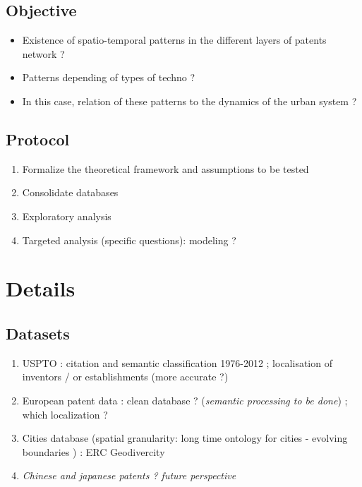 \subsection{Objective}

\begin{itemize}
	\item Existence of spatio-temporal patterns in the different layers of patents network ?
	\item Patterns depending of types of techno ?
	\item In this case, relation of these patterns to the dynamics of the urban system ?
\end{itemize}



\subsection{Protocol}


\begin{enumerate}
	\item Formalize the theoretical framework and assumptions to be tested
	\item Consolidate databases
	\item Exploratory analysis
	\item Targeted analysis (specific questions): modeling ?
\end{enumerate}



\section{Details}


\subsection{Datasets}

\begin{enumerate}
	\item USPTO : citation and semantic classification 1976-2012 \cite{bergeaud2017classifying} ; localisation of inventors / or establishments (more accurate ?) \cite{li2014disambiguation}
	\item European patent data : clean database ? (\textit{semantic processing to be done}) ; which localization ?
	\item Cities database (spatial granularity: long time ontology for cities - evolving boundaries \cite{bretagnolle2009villes}) : ERC Geodivercity
	\item \textit{Chinese and japanese patents ? future perspective}
\end{enumerate}


